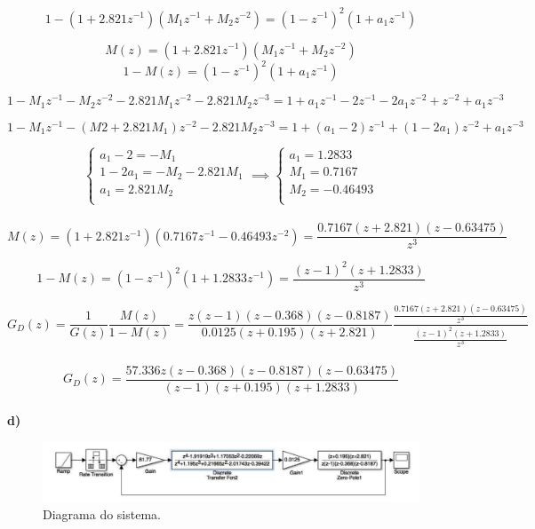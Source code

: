 \documentclass{article}
\begin{document}
    $$ 1- (1+2.821z^{-1})(M_1 z^{-1} + M_2 z^{-2}) = (1-z^{-1})^2 (1+ a_1 z^{-1}) $$

    $$ M(z) = (1+2.821z^{-1})(M_1 z^{-1} + M_2 z^{-2}) $$
    $$ 1-M(z) = (1-z^{-1})^2 (1+ a_1 z^{-1}) $$


    $$ 1 - M_1 z^{-1}  - M_2 z^{-2} - 2.821M_1 z^{-2} - 2.821M_2 z^{-3} = 1 + a_1 z^{-1} - 2z^{-1} -2a_1 z^{-2} + z^{-2} +a_1 z^{-3} $$


    $$ 1 - M_1 z^{-1} - (M2 + 2.821M_1) z^{-2} - 2.821M_2 z^{-3} = 1 + (a_1 - 2)z^{-1} + (1 - 2a_1)z^{-2} + a_1 z^{-3} $$

    \[
        \begin{cases}
            a_1 - 2 = -M_1\\
            1 - 2a_1 = -M_2 - 2.821M_1\\
            a_1 = 2.821M_2\\
        \end{cases}
        \implies
        \begin{cases}
            a_1 = 1.2833\\
            M_1 = 0.7167\\
            M_2 = -0.46493\\
        \end{cases}
    \]\\

    $$ M(z) = (1+2.821z^{-1})(0.7167z^{-1} - 0.46493z^{-2}) = \frac{ 0.7167(z+2.821)(z-0.63475) }{ z^3 } $$

    $$ 1-M(z) = (1-z^{-1})^2 (1+ 1.2833 z^{-1}) = \frac{ (z-1)^2 (z + 1.2833) }{ z^3 } $$

    $$ G_{D}(z) = \frac{1}{G(z)} \frac{M(z)}{1-M(z)} = \frac{ z(z-1)(z-0.368)(z-0.8187) }{ 0.0125(z+0.195)(z+2.821) } \frac{ \frac{ 0.7167(z+2.821)(z-0.63475) }{ z^3 } }{ \frac{ (z-1)^2 (z + 1.2833) }{ z^3 } } $$\\[0.1cm]

    $$ G_{D}(z) = \frac{ 57.336z(z-0.368)(z-0.8187)(z-0.63475) }{ (z-1)(z+0.195)(z+1.2833) } $$\\[0.5cm]


    {\textbf{d)}}

    \begin{figure}[H]
       \centering
            \includegraphics[width=1\linewidth]{images/diagrama1d.png}
            \caption{Diagrama do sistema.}
            \label{fig:diagram1d}
    \end{figure}
\end{document}
